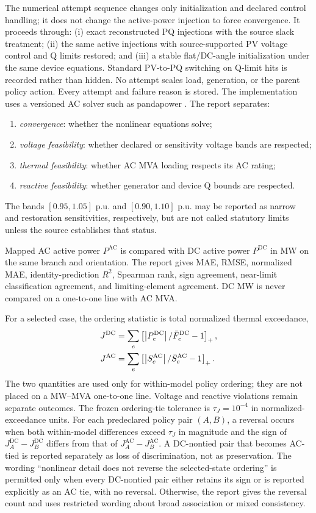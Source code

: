 \documentclass[10pt,journal,onecolumn]{IEEEtran}
\newcommand{\pos}[1]{\left[#1\right]_+}
\newcommand{\abs}[1]{\left|#1\right|}
\begin{document}
The numerical attempt sequence changes only initialization and declared
control handling; it does not change the active-power injection to force
convergence. It proceeds through: (i) exact reconstructed PQ injections with the
source slack treatment; (ii) the same active injections with source-supported
PV voltage control and Q limits restored; and (iii) a stable flat/DC-angle
initialization under the same device equations. Standard PV-to-PQ switching on
Q-limit hits is recorded rather than hidden. No attempt scales load, generation,
or the parent policy action. Every attempt and failure reason is stored. The
implementation uses a versioned AC solver such as pandapower
\cite{Thurner2018}. The report separates:
\begin{enumerate}[leftmargin=*,itemsep=2pt]
\item \emph{convergence}: whether the nonlinear equations solve;
\item \emph{voltage feasibility}: whether declared or sensitivity voltage bands
are respected;
\item \emph{thermal feasibility}: whether AC MVA loading respects its AC rating;
\item \emph{reactive feasibility}: whether generator and device Q bounds are
respected.
\end{enumerate}
The bands $[0.95,1.05]$ p.u. and $[0.90,1.10]$ p.u. may be reported as narrow
and restoration sensitivities, respectively, but are not called statutory
limits unless the source establishes that status.

Mapped AC active power $P^{\mathrm{AC}}$ is compared with DC active power
$P^{\mathrm{DC}}$ in MW on the same branch and orientation. The report gives
MAE, RMSE, normalized MAE, identity-prediction $R^2$, Spearman rank, sign
agreement, near-limit classification agreement, and limiting-element
agreement. DC MW is never compared on a one-to-one line with AC MVA.

For a selected case, the ordering statistic is total normalized thermal
exceedance,
\begin{align}
J^{\mathrm{DC}}
&=\sum_e\pos{\abs{P_e^{\mathrm{DC}}}/\bar F_e^{\mathrm{DC}}-1},
\notag\\
J^{\mathrm{AC}}
&=\sum_e\pos{\abs{S_e^{\mathrm{AC}}}/\bar S_e^{\mathrm{AC}}-1}.
\label{eq:report_ac_ordering}
\end{align}
The two quantities are used only for within-model policy ordering; they are not
placed on a MW--MVA one-to-one line. Voltage and reactive violations remain
separate outcomes. The frozen ordering-tie tolerance is
$\tau_J=10^{-4}$ in normalized-exceedance units. For each predeclared policy
pair $(A,B)$, a reversal occurs when both within-model differences exceed
$\tau_J$ in magnitude and the sign of
$J_A^{\mathrm{DC}}-J_B^{\mathrm{DC}}$ differs from that of
$J_A^{\mathrm{AC}}-J_B^{\mathrm{AC}}$. A DC-nontied pair that becomes AC-tied
is reported separately as loss of discrimination, not as preservation. The
wording ``nonlinear detail does not reverse the selected-state ordering'' is
permitted only when every DC-nontied pair either retains its sign or is reported
explicitly as an AC tie, with no reversal. Otherwise, the report gives the
reversal count and uses restricted wording about broad association or mixed
consistency.
\end{document}
